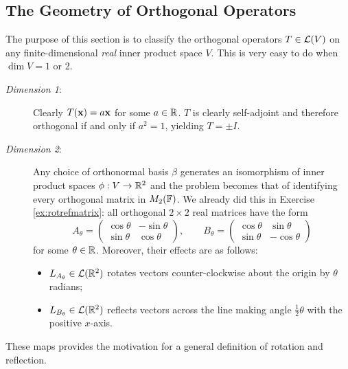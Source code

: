 \clearpage



\iffalse

\setcounter{subsection}{10}
\subsection{The Geometry of Orthogonal Operators}

The purpose of this section is to classify the orthogonal operators $T\in\mathcal{L}(V)$ on any finite-dimensional \emph{real} inner product space $V$. This is very easy to do when $\dim V=1$ or 2.

\begin{description}
	\item[\normalfont\emph{Dimension 1}:] Clearly $T({\mathbf{x}})=a{\mathbf{x}}$ for some $a\in\mathbb{R}$. $T$ is clearly self-adjoint and therefore orthogonal if and only if $a^2=1$, yielding $T=\pm I$.
	\item[\normalfont\emph{Dimension 2}:] Any choice of orthonormal basis $\beta$ generates an isomorphism of inner product spaces $\phi:V\to\mathbb{R}^2$ and the problem becomes that of identifying every orthogonal matrix in $M_2(\mathbb{F})$. We already did this in Exercise \ref{ex:rotrefmatrix}: all orthogonal $2\times 2$ real matrices have the form
\[A_\theta=\begin{pmatrix}
	\cos\theta&-\sin\theta\\
	\sin\theta&\cos\theta
  \end{pmatrix},\qquad B_\theta=\begin{pmatrix}
	\cos\theta&\sin\theta\\
	\sin\theta&-\cos\theta
	\end{pmatrix}\]
for some $\theta\in\mathbb{R}$. Moreover, their effects are as follows:
	\begin{itemize}
	  \item $L_{A_\theta}\in\mathcal{L}(\mathbb{R}^2)$ rotates vectors counter-clockwise about the origin by $\theta$ radians;
	  \item $L_{B_\theta}\in\mathcal{L}(\mathbb{R}^2)$ reflects vectors across the line making angle $\frac 12\theta$ with the positive $x$-axis.
	\end{itemize}
\end{description}
	
These maps provides the motivation for a general definition of rotation and reflection.
	
